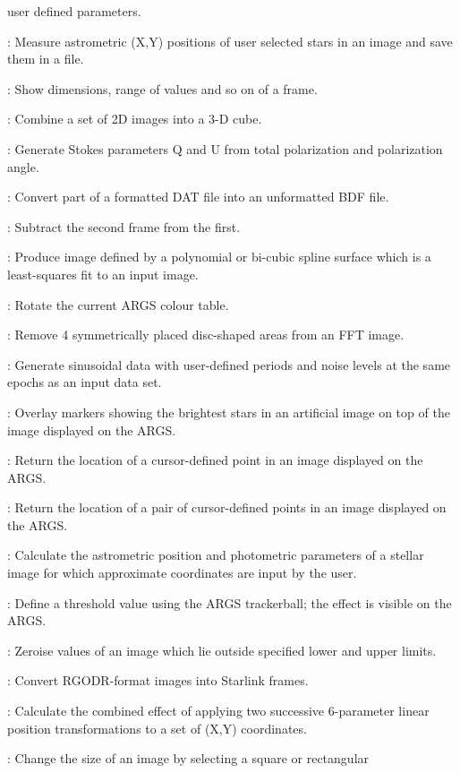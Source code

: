 \begin{description}
user defined parameters.
\item [STARXY]: Measure astrometric (X,Y) positions of user selected stars in an
image and save them in a file.
\item [STATS]: Show dimensions, range of values and so on of a frame.
\item [STK23]: Combine a set of 2D images into a 3-D cube.
\item [STOKES]: Generate Stokes parameters Q and U from total polarization
and polarization angle.
\item [STORE]: Convert part of a formatted DAT file into an unformatted BDF
file.
\item [SUB]: Subtract the second frame from the first.
\item [SURFIT]: Produce image defined by a polynomial or bi-cubic spline surface
which is a least-squares fit to an input image.
\item [SWEEP]: Rotate the current ARGS colour table.
\item [SYMDIS*]: Remove 4 symmetrically placed disc-shaped areas from an FFT
image.
\item [SYNTH]: Generate sinusoidal data with user-defined periods and noise
levels at the same epochs as an input data set.
\item [TARGET]: Overlay markers showing the brightest stars in an artificial
image on top of the image displayed on the ARGS.
\item [TBXY]: Return the location of a cursor-defined point in an image
displayed on the ARGS.
\item [TBXY2]: Return the location of a pair of cursor-defined points in an
image displayed on the ARGS.
\item [TESTFIT]: Calculate the astrometric position and photometric parameters
of a stellar image for which approximate coordinates are input by the user.
\item [THRESH]: Define a threshold value using the ARGS trackerball; the effect
is visible on the ARGS.
\item [THRESHOLD]: Zeroise values of an image which lie outside specified
lower and upper limits.
\item [TOSTAR]: Convert RGODR-format images into Starlink frames.
\item [TRCONCAT]: Calculate the combined effect of applying two successive
6-parameter linear position transformations to a set of (X,Y) coordinates.
\item [TRIM]: Change the size of an image by selecting a square or rectangular

\end{description}
